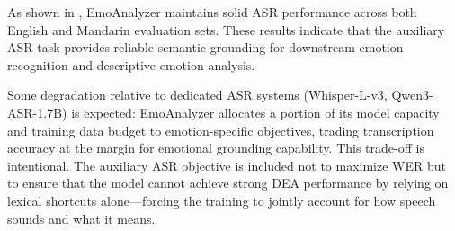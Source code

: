 

As shown in , EmoAnalyzer maintains solid ASR performance across both English and Mandarin evaluation sets. These results indicate that the auxiliary ASR task provides reliable semantic grounding for downstream emotion recognition and descriptive emotion analysis.

Some degradation relative to dedicated ASR systems (Whisper-L-v3, Qwen3-ASR-1.7B) is expected: EmoAnalyzer allocates a portion of its model capacity and training data budget to emotion-specific objectives, trading transcription accuracy at the margin for emotional grounding capability. This trade-off is intentional. The auxiliary ASR objective is included not to maximize WER but to ensure that the model cannot achieve strong DEA performance by relying on lexical shortcuts alone---forcing the training to jointly account for how speech sounds and what it means.
